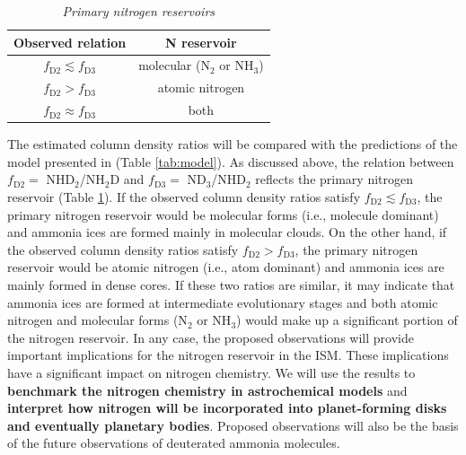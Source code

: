 \documentclass[12pt,a4paper]{article}  %
\begin{document}
\begin{table}
  \vspace{-1.8em}
 \caption{\emph{Primary nitrogen reservoirs}}
 \centering
 \begin{tabular}{cc}
  \hline \hline
  Observed relation & N reservoir \\
  \hline 
  $f_\mathrm{D2} \lesssim f_\mathrm{D3}$ & molecular (N$_2$ or NH$_3$) \\
  $f_\mathrm{D2} > f_\mathrm{D3}$ & atomic nitrogen \\
  $f_\mathrm{D2} \approx f_\mathrm{D3}$ & both \\
  \hline
 \end{tabular}
 \label{tab:obs_resevoir}
\end{table}


The estimated column density ratios will be compared with the predictions of the model presented in \citet{Furuya18} (Table \ref{tab:model}). As discussed above, the relation between $f_\mathrm{D2}=$ NHD$_2$/NH$_2$D and $f_\mathrm{D3}=$ ND$_3$/NHD$_2$ reflects the primary nitrogen reservoir (Table \ref{tab:obs_resevoir}). If the observed column density ratios satisfy $f_\mathrm{D2} \lesssim f_\mathrm{D3}$, the primary nitrogen reservoir would be molecular forms (i.e., molecule dominant) and ammonia ices are formed mainly in molecular clouds. On the other hand, if the observed column density ratios satisfy $f_\mathrm{D2} > f_\mathrm{D3}$, the primary nitrogen reservoir would be atomic nitrogen (i.e., atom dominant) and ammonia ices are mainly formed in dense cores. If these two ratios are similar, it may indicate that ammonia ices are formed at intermediate evolutionary stages and both atomic nitrogen and molecular forms (N$_2$ or NH$_3$) would make up a significant portion of the nitrogen reservoir. In any case, the proposed observations will provide important implications for the nitrogen reservoir in the ISM. These implications have a significant impact on nitrogen chemistry. We will use the results to \textbf{benchmark the nitrogen chemistry in astrochemical models} and \textbf{interpret how nitrogen will be incorporated into planet-forming disks and eventually planetary bodies}. Proposed observations will also be the basis of the future observations of deuterated ammonia molecules.
\end{document}
